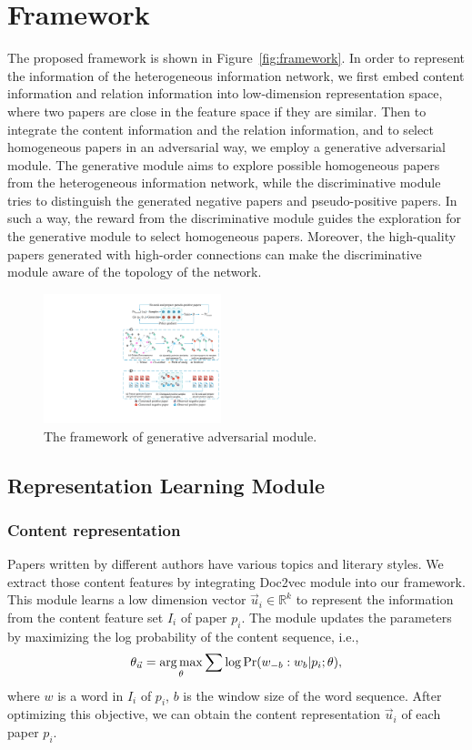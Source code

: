 \documentclass[letterpaper]{article}
\begin{document}
\section{Framework}

The proposed framework is shown in Figure~\ref{fig:framework}.
In order to represent the information of the heterogeneous information network, we first embed content information and relation information into low-dimension representation space, where two papers are close in the feature space if they are similar.
Then to integrate the content information and the relation information, and to select homogeneous papers in an adversarial way, we employ a generative adversarial module.
The generative module aims to explore possible homogeneous papers from the heterogeneous information network, while the discriminative module tries to distinguish the generated negative papers and pseudo-positive papers.
In such a way, the reward from the discriminative module guides the exploration for the generative module to select homogeneous papers. Moreover, the high-quality papers generated with high-order connections can make the discriminative module aware of the topology of the network.
\begin{figure}[t]
\centering
\includegraphics[width=0.46\textwidth]{GAN1.pdf}
\caption{The framework of generative adversarial module.}
\label{fig:GAN_framework}
\end{figure}
\subsection{Representation Learning Module}
\subsubsection{Content representation} \label{sec:content}
Papers written by different authors have various topics and literary styles.
We extract those content features by integrating Doc2vec module \cite{Doc2vec} into our framework. This module learns a low dimension vector $\vec{u}_i \in \mathbb{R}^k$ to represent the information from the content feature set $I_i$ of paper $p_i$. The module updates the parameters by maximizing the log probability of the content sequence, i.e.,
\begin{equation}
\centering
\theta_{\vec{u}} = \mathop{\arg\max}_{\theta} \sum \log \text{Pr}(w_{-b}:w_{b}|p_i; \theta),
\label{eq:doc2vec}
\end{equation}
where $w$ is a word in $I_i$ of $p_i$, $b$ is the window size of the word sequence.
After optimizing this objective, we can obtain the content representation $\vec{u}_i$ of each paper $p_i$.
\end{document}
